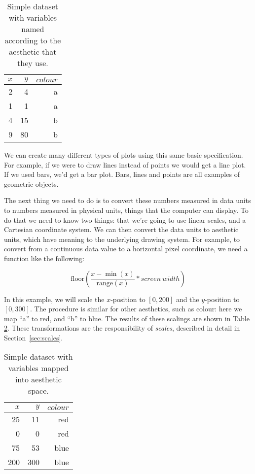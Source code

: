 \begin{table}[ht]
	\begin{center}
	\begin{tabular}{r|r|r}
		$x$ & $y$ & $colour$\\
		\hline
		2 & 4 & a\\
		1 & 1 & a\\
		4 & 15 & b\\
		9 & 80 & b
	\end{tabular}
	\end{center}
	\caption{Simple dataset with variables named according to the aesthetic that they use.}
	\label{tbl:mapping}
\end{table}

We can create many different types of plots using this same basic specification.  For example, if we were to draw lines instead of points we would get a line plot.  If we used bars, we'd get a bar plot.  Bars, lines and points are all examples of geometric objects.  


The next thing we need to do is to convert these numbers measured in data units to numbers measured in physical units, things that the computer can display.  To do that we need to know two things: that we're going to use linear scales, and a Cartesian coordinate system.  We can then convert the data units to aesthetic units, which have meaning to the underlying drawing system.  For example, to convert from a continuous data value to a horizontal pixel coordinate, we need a function like the following:

\[ \mbox{floor} (\frac{x - \min(x)}{\mbox{range}(x)} * {screen\ width})  \] 

\noindent In this example, we will scale the $x$-position to $[0, 200]$ and the $y$-position to $[0, 300]$.  The procedure is similar for other aesthetics, such as colour: here we map ``a'' to red, and ``b'' to blue.  The results of these scalings are shown in Table \ref{tbl:scaled}.  These transformations are the responsibility of {\em scales}, described in detail in Section~\ref{sec:scales}.

\begin{table}[ht]
	\begin{center}
	\begin{tabular}{r|r|r}
		$x$ & $y$ & $colour$\\
		\hline
		25 & 11 & red\\
		0 & 0 & red \\
		75  & 53 & blue \\
		200 & 300 & blue
	\end{tabular}
	\end{center}
	\caption{Simple dataset with variables mapped into aesthetic space.}
	\label{tbl:scaled}
\end{table}

